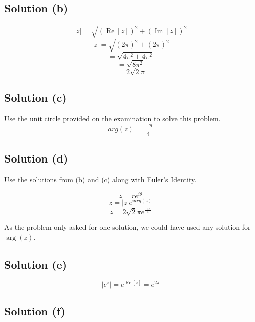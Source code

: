 \documentclass[12pt]{article}
\renewcommand{\Re}{\operatorname{Re}}
\renewcommand{\Im}{\operatorname{Im}}
\begin{document}
\subsection{Solution (b)}
\begin{equation}
	|z|=\sqrt{(\Re[z])^2+(\Im[z])^2}
\end{equation}
\begin{equation}
	|z|=\sqrt{(2\pi)^2+(2\pi)^2}
\end{equation}
\begin{equation}
	=\sqrt{4\pi^2+4\pi^2}
\end{equation}
\begin{equation}
	=\sqrt{8\pi^2}
\end{equation}
\begin{equation}
	=2\sqrt{2}\pi
\end{equation}
\subsection{Solution (c)}
Use the unit circle provided on the examination to solve this problem.
\begin{equation}
	arg(z)=\frac{-\pi}{4}
\end{equation}
\subsection{Solution (d)}
Use the solutions from (b) and (c) along with Euler's Identity.

\begin{equation}
	z=re^{i\theta}
\end{equation}
\begin{equation}
	z=|z|e^{iarg(z)}
\end{equation}
\begin{equation}
	z=2\sqrt{2}\pi e^{\frac{-i\pi}{4}}
\end{equation}

As the problem only asked for one solution, we could have used any solution for $\arg(z)$.
\subsection{Solution (e)}

\begin{equation}
	|e^z|=e^{\Re[z]}=e^{2\pi}
\end{equation}
\subsection{Solution (f)}
\end{document}
